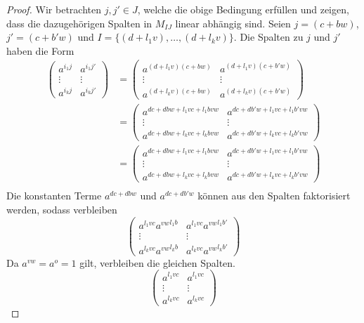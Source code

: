 \begin{proof}
    Wir betrachten $j,j' \in J$, welche die obige Bedingung erfüllen und zeigen, dass die dazugehörigen Spalten in $M_{IJ}$ linear abhängig sind. Seien $j = (c + bw)$, $j' = (c + b'w)$ und $I = \{(d+l_1v),\dots,(d+l_kv)\}$. Die Spalten zu $j$ und $j'$ haben die Form
    \begin{align*}
        \begin{pmatrix}
            a^{i_1j} & a^{i_1j'} \\
            \vdots & \vdots \\
            a^{i_kj} & a^{i_kj'}
        \end{pmatrix} &=
        \begin{pmatrix}
            a^{(d+l_1v)(c + bw)} & a^{(d+l_1v)(c + b'w)} \\
            \vdots & \vdots \\
            a^{(d+l_kv)(c + bw)} & a^{(d+l_kv)(c + b'w)}
        \end{pmatrix} \\
        &= \begin{pmatrix}
            a^{dc + dbw +l_1vc + l_1bvw} & a^{dc + db'w +l_1vc + l_1b'vw} \\
            \vdots & \vdots \\
            a^{dc + dbw +l_kvc + l_kbvw} & a^{dc + db'w +l_kvc + l_kb'vw}
        \end{pmatrix} \\
        &= \begin{pmatrix}
            a^{dc + dbw +l_1vc + l_1bvw} & a^{dc + db'w +l_1vc + l_1b'vw} \\
            \vdots & \vdots \\
            a^{dc + dbw +l_kvc + l_kbvw} & a^{dc + db'w +l_kvc + l_kb'vw}
        \end{pmatrix} \\
    \end{align*}
    Die konstanten Terme $a^{dc + dbw}$ und $a^{dc + db'w}$ können aus den Spalten faktorisiert werden, sodass verbleiben
    \begin{equation*}
        \begin{pmatrix}
            a^{l_1vc} {a^{vw}}^{l_1b} & a^{l_1vc} {a^{vw}}^{l_1b'} \\
            \vdots & \vdots \\
            a^{l_kvc} {a^{vw}}^{l_kb} & a^{l_kvc} {a^{vw}}^{l_kb'}
        \end{pmatrix}
    \end{equation*}
    Da $a^{vw} = a^{o} = 1$ gilt, verbleiben die gleichen Spalten.
    \begin{equation*}
        \begin{pmatrix}
            a^{l_1vc} & a^{l_1vc} \\
            \vdots & \vdots \\
            a^{l_kvc} & a^{l_kvc}
        \end{pmatrix}
    \end{equation*}
\end{proof}

